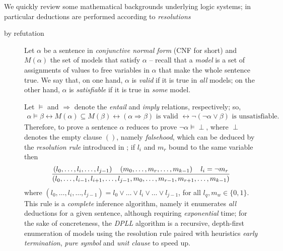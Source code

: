 \documentclass[a4paper,12pt]{article}
\begin{document}
We quickly review some mathematical backgrounds underlying logic systems;
in particular deductions are performed according to \emph{resolutions}

\begin{description}

\item[by refutation] Let $\alpha$ be a sentence in \emph{conjunctive normal
form} (CNF for short) and $M(\alpha)$ the set of models that satisfy $\alpha$
-- recall that a \emph{model} is a set of assignments of values to free
variables in $\alpha$ that make the whole sentence true.  We say that, on one
hand, $\alpha$ is \textit{valid} if it is true in \textit{all} models; on the
other hand, $\alpha$ is \textit{satisfiable} if it is true in \textit{some}
model.

Let $\models$ and $\Rightarrow$ denote the \textit{entail} and \textit{imply}
relations, respectively; so,
\begin{displaymath}
\begin{split}
\alpha \models \beta \leftrightarrow
M(\alpha) \subseteq M(\beta) \leftrightarrow
(\alpha \Rightarrow \beta) \text{ is valid } \leftrightarrow
\neg(\neg\alpha \vee \beta) \text{ is unsatisfiable.}
\end{split}
\end{displaymath}
Therefore, to prove a sentence $\alpha$ reduces to prove
$\neg\alpha\models\perp$, where $\perp$ denotes the empty clause $()$, namely
\textit{falsehood}, which can be deduced by the \textit{resolution rule}
introduced in \citep{Robinson:1965:MLB:321250.321253}; if $l_{i}$ and $m_{r}$
bound to the same variable then
\begin{displaymath}
{\left(l_{0}, \ldots, l_{i}, \ldots, l_{j-1}\right) \quad \left(m_{0}, \ldots, m_{r},\ldots, m_{k-1}\right) \quad l_{i} = \neg m_{r}
\over
\left(l_{0},\ldots, l_{i-1},l_{i+1}, \ldots,l_{j-1}, m_{0},\ldots, m_{r-1},m_{r+1},\ldots, m_{k-1}\right)}
\end{displaymath}
where $\left(l_{0},\ldots, l_{i}, \ldots, l_{j-1}\right) = l_{0}\vee \ldots
\vee l_{i} \vee \ldots \vee l_{j-1}$, for all $l_{q}, m_{w} \in\lbrace 0,1\rbrace$.
This rule is a \textit{complete} inference algorithm, namely it enumerates
\emph{all} deductions for a given sentence, although requiring
\emph{exponential} time; for the sake of concreteness, the \textit{DPLL}
algorithm \citep{Davis:1962:MPT:368273.368557}
is a recursive, depth-first enumeration of models using the
resolution rule paired with heuristics \textit{early termination},
\textit{pure symbol} and \textit{unit clause} to speed up.


\end{description}
\end{document}

